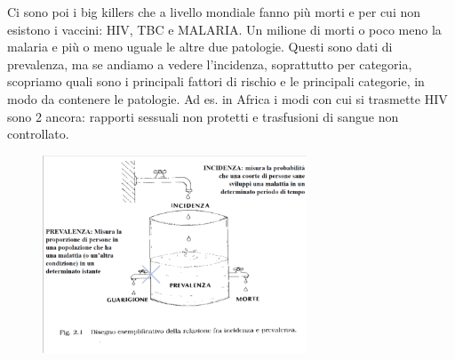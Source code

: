 Ci sono poi i big killers che a livello mondiale fanno più morti e per
cui non esistono i vaccini: HIV, TBC e MALARIA. Un milione di morti o
poco meno la malaria e più o meno uguale le altre due patologie. Questi
sono dati di prevalenza, ma se andiamo a vedere l'incidenza, soprattutto
per categoria, scopriamo quali sono i principali fattori di rischio e le
principali categorie, in modo da contenere le patologie. Ad es. in
Africa i modi con cui si trasmette HIV sono 2 ancora: rapporti sessuali
non protetti e trasfusioni di sangue non controllato.

\begin{figure}[!ht]
\centering
	\includegraphics[width=0.7\textwidth]{03/image10.png}
\end{figure}

